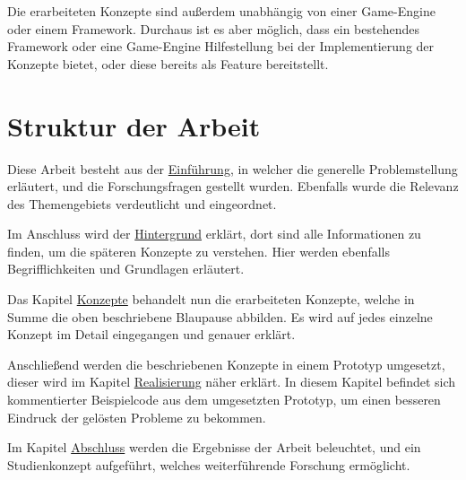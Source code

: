 Die erarbeiteten Konzepte sind außerdem unabhängig von einer Game-Engine oder einem Framework. Durchaus ist es aber möglich, dass ein bestehendes Framework oder eine Game-Engine Hilfestellung bei der Implementierung der Konzepte bietet, oder diese bereits als Feature bereitstellt.

\section{Struktur der Arbeit}

Diese Arbeit besteht aus der \hyperref[sec:einfuehrung]{Einführung}, in welcher die generelle Problemstellung erläutert, und die Forschungsfragen gestellt wurden. Ebenfalls wurde die Relevanz des Themengebiets verdeutlicht und eingeordnet.

Im Anschluss wird der  \hyperref[sec:hintergrund]{Hintergrund} erklärt, dort sind alle Informationen zu finden, um die späteren Konzepte zu verstehen. Hier werden ebenfalls Begrifflichkeiten und Grundlagen erläutert.

Das Kapitel \hyperref[sec:konzepte]{Konzepte} behandelt nun die erarbeiteten Konzepte, welche in Summe die oben beschriebene Blaupause abbilden. Es wird auf jedes einzelne Konzept im Detail eingegangen und genauer erklärt. 
 
Anschließend werden die beschriebenen Konzepte in einem Prototyp umgesetzt, dieser wird im Kapitel \hyperref[sec:realisierung]{Realisierung} näher erklärt. In diesem Kapitel befindet sich kommentierter Beispielcode aus dem umgesetzten Prototyp, um einen besseren Eindruck der gelösten Probleme zu bekommen.

Im Kapitel \hyperref[sec:zusammenfassung]{Abschluss} werden die Ergebnisse der Arbeit beleuchtet, und ein Studienkonzept aufgeführt, welches weiterführende Forschung ermöglicht.
